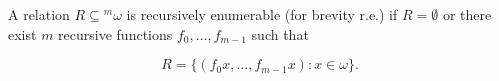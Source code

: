 A relation $R \subseteq {}^m \omega$ is recursively enumerable (for brevity r.e.) if $R = \emptyset$ or there exist $m$ recursive functions $f_0, \ldots, f_{m-1}$ such that

$$R = \{(f_0 x, \ldots, f_{m-1} x) : x \in \omega\}.$$
